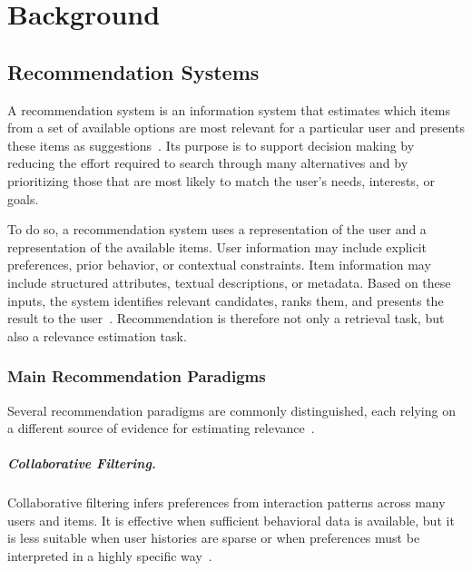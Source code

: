 
\chapter{Background}\label{chapter:background}

\section{Recommendation Systems}\label{section:background:recommendation-systems}
A recommendation system is an information system that estimates which items from a set of available options are most relevant for a particular user and presents these items as suggestions~\parencite{adomaviciusTuzhilinNextGeneration}. Its purpose is to support decision making by reducing the effort required to search through many alternatives and by prioritizing those that are most likely to match the user's needs, interests, or goals.

To do so, a recommendation system uses a representation of the user and a representation of the available items. User information may include explicit preferences, prior behavior, or contextual constraints. Item information may include structured attributes, textual descriptions, or metadata. Based on these inputs, the system identifies relevant candidates, ranks them, and presents the result to the user~\parencite{luRecommenderSystems}. Recommendation is therefore not only a retrieval task, but also a relevance estimation task.

\subsection{Main Recommendation Paradigms}
Several recommendation paradigms are commonly distinguished, each relying on a different source of evidence for estimating relevance~\parencite{adomaviciusTuzhilinNextGeneration}.

\paragraph{Collaborative Filtering.}
Collaborative filtering infers preferences from interaction patterns across many users and items. It is effective when sufficient behavioral data is available, but it is less suitable when user histories are sparse or when preferences must be interpreted in a highly specific way~\parencite{suKhoshgoftaarCollaborativeFiltering}.

